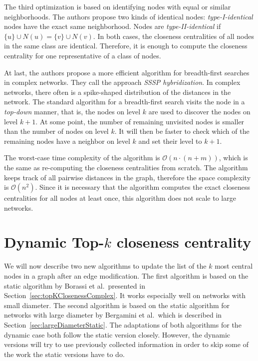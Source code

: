 The third optimization is based on identifying nodes with equal or similar neighborhoods. The authors propose two kinds of identical nodes: \emph{type-I-identical} nodes have the exact same neighborhood. Nodes are \emph{type-II-identical} if $\{u\} \cup N(u) = \{v\} \cup N(v)$. In both cases, the closeness centralities of all nodes in the same class are identical. Therefore, it is enough to compute the closeness centrality for one representative of a class of nodes.

At last, the authors propose a more efficient algorithm for breadth-first searches in complex networks. They call the approach \emph{SSSP hybridization}. In complex networks, there often is a spike-shaped distribution of the distances in the network. The standard algorithm for a breadth-first search visits the node in a \emph{top-down} manner, that is, the nodes on level $k$ are used to discover the nodes on level $k + 1$. At some point, the number of remaining unvisited nodes is smaller than the number of nodes on level $k$. It will then be faster to check which of the remaining nodes have a neighbor on level $k$ and set their level to $k + 1$.

The worst-case time complexity of the algorithm is $\mathcal{O}(n \cdot (n + m))$, which is the same as re-computing the closeness centralities from scratch. The algorithm keeps track of all pairwise distances in the graph, therefore the space complexity is $\mathcal{O}(n^2)$. Since it is necessary that the algorithm computes the exact closeness centralities for all nodes at least once, this algorithm does not scale to large networks.

\section{Dynamic Top-$k$ closeness centrality}
We will now describe two new algorithms to update the list of the $k$ most central nodes in a graph after an edge modification. The first algorithm is based on the static algorithm by Borassi et al.\ presented in Section~\ref{sec:topKClosenessComplex}. It works especially well on networks with small diameter. The second algorithm is based on the static algorithm for networks with large diameter by Bergamini et al.\ which is described in Section~\ref{sec:largeDiameterStatic}. The adaptations of both algorithms for the dynamic case both follow the static version closely. However, the dynamic versions will try to use previously collected information in order to skip some of the work the static versions have to do.

